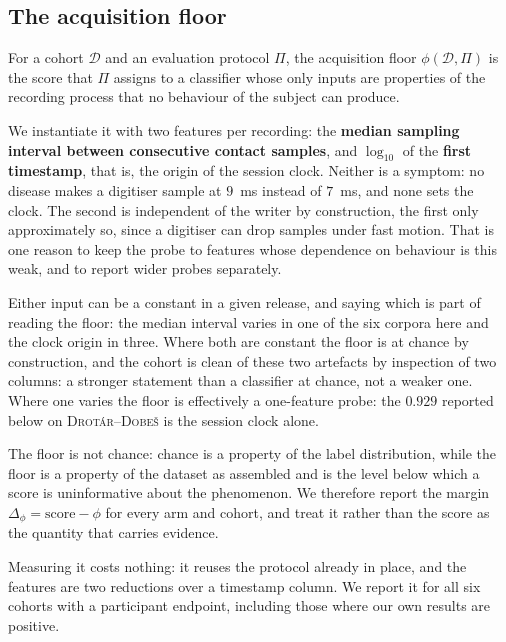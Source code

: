 \subsection{The acquisition floor}
\label{sec:floor}


\begin{definition}
For a cohort $\mathcal{D}$ and an evaluation protocol $\Pi$, the acquisition floor
$\phi(\mathcal{D}, \Pi)$ is the score that $\Pi$ assigns to a classifier whose only inputs are
properties of the recording process that no behaviour of the subject can produce.
\end{definition}

We instantiate it with two features per recording: the \textbf{median sampling interval between
consecutive contact samples}, and $\log_{10}$ of the \textbf{first timestamp}, that is, the origin
of the session clock. Neither is a symptom: no disease makes a digitiser sample at $9$~ms instead
of $7$~ms, and none sets the clock. The second is independent of the writer by construction, the
first only approximately so, since a digitiser can drop samples under fast motion. That is one
reason to keep the probe to features whose dependence on behaviour is this weak, and to report wider
probes separately.

Either input can be a constant in a given release, and saying which is part of reading the floor:
the median interval varies in one of the six corpora here and the clock origin in three. Where
both are constant the floor is at chance by construction, and the cohort is clean of these two
artefacts by inspection of two columns: a stronger statement than a classifier at chance, not a
weaker one. Where one varies the floor is effectively a one-feature probe: the $0.929$ reported
below on \textsc{Drot\'ar--Dobe\v{s}} is the session clock alone.

The floor is not chance: chance is a property of the label distribution, while the floor is a
property of the dataset as assembled and is the level below which a score is uninformative about the
phenomenon. We therefore report the margin $\Delta_\phi = \text{score} - \phi$ for every arm and
cohort, and treat it rather than the score as the quantity that carries evidence.

Measuring it costs nothing: it reuses the protocol already in place, and the features are two
reductions over a timestamp column. We report it for all six cohorts with a participant endpoint,
including those where our own results are positive.

